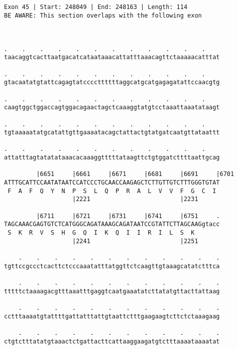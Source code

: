\documentclass{article}
\begin{document}
\begin{Verbatim}
  
 
Exon 45 | Start: 248049 | End: 248163 | Length: 114
BE AWARE: This section overlaps with the following exon



.    .    .    .    .    .    .    .    .    .    .    .    
taacaggtcacttaatgacatcataataaacattatttaaacagttctaaaaacatttat
                                                            
.    .    .    .    .    .    .    .    .    .    .    .    
gtacaatatgtattcagagtatccccttttttaggcatgcatgagagatattccaacgtg
                                                            
.    .    .    .    .    .    .    .    .    .    .    .    
caagtggctggaccagtggacagaactagctcaaaggtatgtcctaaattaaatataagt
                                                            
.    .    .    .    .    .    .    .    .    .    .    .    
tgtaaaaatatgcatattgttgaaaatacagctattactgtatgatcaatgttataattt
                                                            
.    .    .    .    .    .    .    .    .    .    .    .    
attatttagtatatataaacacaaaggtttttataagttctgtggatcttttaattgcag
                                                            
         |6651     |6661     |6671     |6681     |6691     |6701
ATTTGCATTCCAATATAATCCATCCCTGCAACCAAGAGCTCTTGTTGTCTTTGGGTGTAT
 F  A  F  Q  Y  N  P  S  L  Q  P  R  A  L  V  V  F  G  C  I 
                   |2221                         |2231      
  
         |6711     |6721     |6731     |6741     |6751     .
TAGCAAACGAGTGTCTCATGGGCAGATAAAGCAGATAATCCGTATTCTTAGCAAGgtacc
 S  K  R  V  S  H  G  Q  I  K  Q  I  I  R  I  L  S  K       
                   |2241                         |2251      
  
    .    .    .    .    .    .    .    .    .    .    .    .
tgttccgccctcacttctcccaaatatttatggttctcaagttgtaaagcatatctttca
                                                            
    .    .    .    .    .    .    .    .    .    .    .    .
tttttctaaaagacgtttaaatttgaggtcaatgaaatatcttatatgttacttattaag
                                                            
    .    .    .    .    .    .    .    .    .    .    .    .
cctttaaaatgtattttgattatttattgtaattctttgaagaagtcttctctaaagaag
                                                            
    .    .    .    .    .    .    .    .    .    .    .    .
ctgtctttatatgtaaactctgattacttcattaaggaagatgtctttaaaataaaatat
                                                            

\end{Verbatim}
\end{document}
